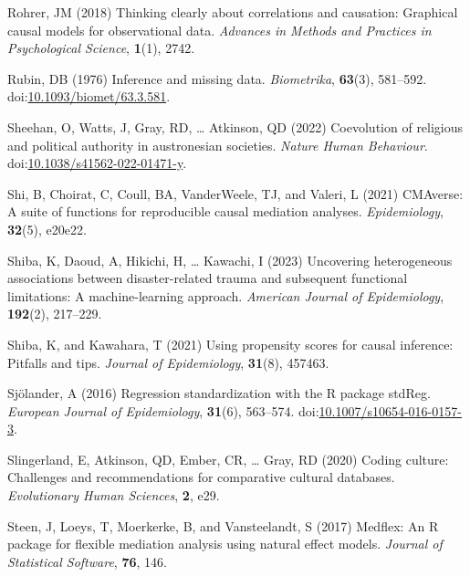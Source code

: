 \documentclass[
  singlecolumn]{article}
\newlength{\cslhangindent}
\newenvironment{CSLReferences}[2] %
 {\begin{list}{}{%
  \setlength{\itemindent}{0pt}
  \setlength{\leftmargin}{0pt}
  \setlength{\parsep}{0pt}
  \ifodd #1
   \setlength{\leftmargin}{\cslhangindent}
   \setlength{\itemindent}{-1\cslhangindent}
  \fi
  \setlength{\itemsep}{#2\baselineskip}}}
 {\end{list}}
\begin{document}
\begin{CSLReferences}{1}{0}
Rohrer, JM (2018) Thinking clearly about correlations and causation:
Graphical causal models for observational data. \emph{Advances in
Methods and Practices in Psychological Science}, \textbf{1}(1), 2742.

Rubin, DB (1976) Inference and missing data. \emph{Biometrika},
\textbf{63}(3), 581--592.
doi:\href{https://doi.org/10.1093/biomet/63.3.581}{10.1093/biomet/63.3.581}.

Sheehan, O, Watts, J, Gray, RD, \ldots{} Atkinson, QD (2022) Coevolution
of religious and political authority in austronesian societies.
\emph{Nature Human Behaviour}.
doi:\href{https://doi.org/10.1038/s41562-022-01471-y}{10.1038/s41562-022-01471-y}.

Shi, B, Choirat, C, Coull, BA, VanderWeele, TJ, and Valeri, L (2021)
CMAverse: A suite of functions for reproducible causal mediation
analyses. \emph{Epidemiology}, \textbf{32}(5), e20e22.

Shiba, K, Daoud, A, Hikichi, H, \ldots{} Kawachi, I (2023) Uncovering
heterogeneous associations between disaster-related trauma and
subsequent functional limitations: A machine-learning approach.
\emph{American Journal of Epidemiology}, \textbf{192}(2), 217--229.

Shiba, K, and Kawahara, T (2021) Using propensity scores for causal
inference: Pitfalls and tips. \emph{Journal of Epidemiology},
\textbf{31}(8), 457463.

Sjölander, A (2016) Regression standardization with the R package
stdReg. \emph{European Journal of Epidemiology}, \textbf{31}(6),
563--574.
doi:\href{https://doi.org/10.1007/s10654-016-0157-3}{10.1007/s10654-016-0157-3}.

Slingerland, E, Atkinson, QD, Ember, CR, \ldots{} Gray, RD (2020) Coding
culture: Challenges and recommendations for comparative cultural
databases. \emph{Evolutionary Human Sciences}, \textbf{2}, e29.

Steen, J, Loeys, T, Moerkerke, B, and Vansteelandt, S (2017) Medflex: An
{R} package for flexible mediation analysis using natural effect models.
\emph{Journal of Statistical Software}, \textbf{76}, 146.


\end{CSLReferences}
\end{document}
